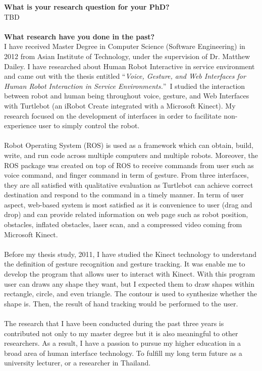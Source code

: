 \documentclass[11pt,a4paper,roman]{moderncv}        %
\begin{document}
\makecvtitle
\textbf{What is your research question for your PhD?}
\\
TBD
\\
\\
\textbf{What research have you done in the past?}
\\
I have received Master Degree in Computer Science (Software Engineering) in 2012 from Asian Institute of Technology, under the supervision of Dr. Matthew Dailey. I have researched about Human Robot Interactive in service environment and came out with the thesis entitled ``\emph{Voice, Gesture, and Web Interfaces for Human Robot Interaction in Service Environments.}''\ I studied the interaction between robot and human being throughout voice, gesture, and Web Interfaces with Turtlebot (an iRobot Create integrated with a Microsoft Kinect). My research focused on the development of interfaces in order to facilitate non-experience user to simply control the robot. 
\\
\\
Robot Operating System (ROS) is used as a framework which can obtain, build, write, and run code across multiple computers and multiple robots. Moreover, the ROS package was created on top of ROS to receive commands from user such as voice command, and finger command in term of gesture. From three interfaces, they are all satisfied with qualitative evaluation as Turtlebot can achieve correct destination and respond to the command in a timely manner. In term of user aspect, web-based system is most satisfied as it is convenience to user (drag and drop) and can provide related information on web page such as robot position, obstacles, inflated obstacles, laser scan, and a compressed video coming from Microsoft Kinect.
\\
\\
Before my thesis study, 2011, I have studied the Kinect technology to understand the definition of gesture recognition and gesture tracking. It was enable me to develop the program that allows user to interact with Kinect. With this program user can draws any shape they want, but I expected them to draw shapes within rectangle, circle, and even triangle. The contour is used to synthesize whether the shape is. Then, the result of hand tracking would be performed to the user. 
\\
\\
The research that I have been conducted during the past three years is contributed not only to my master degree but it is also meaningful to other researchers. As a result, I have a passion to pursue my higher education in a broad area of human interface technology. To fulfill my long term future as a university lecturer, or a researcher in Thailand. 
		
\end{document}
